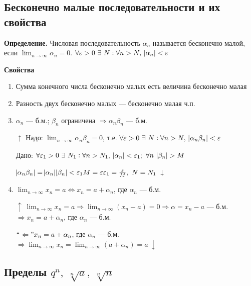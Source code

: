 \documentclass{article}
\begin{document}
    \subsection{Бесконечно малые последовательности и их свойства}
    
    \textbf{Определение.} Числовая последовательность \(\alpha_n\) называется бесконечно малой, если \(\lim_{n \rightarrow \infty}{\alpha_n} = 0\). \(\forall \varepsilon > 0\ \exists\ N : \forall n > N,\ \abs{\alpha_n} < \varepsilon\)
    
    \textbf{Свойства}
    
    \begin{enumerate}
    	\item Сумма конечного числа бесконечно малых есть величина бесконечно малая
        \item Разность двух бесконечно малых --- бесконечно малая ч.п.
        \item \(\alpha_n\) --- б.м.; \(\beta_n\) ограничена \(\Rightarrow \alpha_n \beta_n\) --- б.м.
        
        \(\uparrow\) Надо: \(\lim_{n \rightarrow \infty}{\alpha_n \beta_n} = 0\), т.е. \(\forall \varepsilon > 0\ \exists\ N : \forall n > N,\ \abs{\alpha_n \beta_n} < \varepsilon\)
        
        Дано: \(\forall \varepsilon_1 > 0\ \exists\ N_1 : \forall n > N_1,\ \abs{\alpha_n} < \varepsilon_1;\ \forall n\ \abs{\beta_n} > M\)
        
        \(\abs{\alpha_n \beta_n} = \abs{\alpha_n} \abs{\beta_n} < \varepsilon_1 M = \varepsilon\\ \varepsilon_1 = \frac{\varepsilon}{M},\ N = N_1\ \downarrow\)
        
        \item \(\lim_{n \rightarrow \infty}{x_n} = a \Leftrightarrow x_n = a + \alpha_n\), где \(\alpha_n\) --- б.м.
        
        \(\uparrow\ \lim_{n \rightarrow \infty}{x_n} = a \Rightarrow \lim_{n \rightarrow \infty}{(x_n - a)} = 0 \Rightarrow \alpha = x_n - a\) --- б.м. \(\Rightarrow x_n = a + \alpha_n\), где \(\alpha_n\) --- б.м.
        
        \(``\Leftarrow" x_n = a + \alpha_n\), где \(\alpha_n\) --- б.м. \(\Rightarrow \lim_{n \rightarrow \infty}{x_n} = \lim_{n \rightarrow \infty}{(a + \alpha_n)} = a\ \downarrow\)
    \end{enumerate}
    
    \subsection{Пределы \(q^n,\ \sqrt[n]{a},\ \sqrt[n]{n}\)}
    
\end{document}

